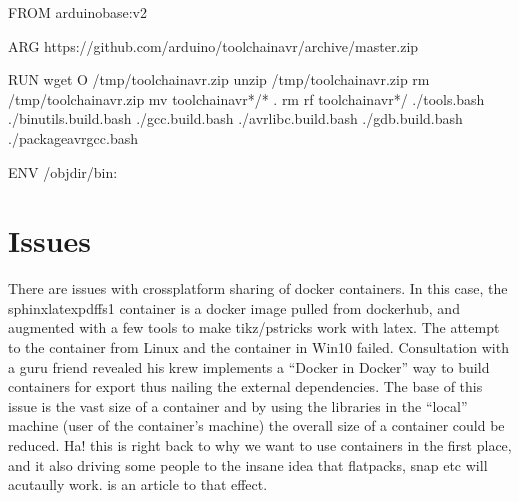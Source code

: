 \documentclass[letterpaper,10pt,english,openany,oneside]{sphinxmanual}
\begin{document}
\begin{sphinxVerbatim}[commandchars=\\\{\},numbers=left,firstnumber=1,stepnumber=1]
FROM arduino\PYGZus{}base:v2

ARG https://github.com/arduino/toolchain\PYGZhy{}avr/archive/master.zip

RUN wget  \PYGZhy{}O /tmp/toolchain\PYGZhy{}avr.zip  
    unzip /tmp/toolchain\PYGZhy{}avr.zip  
    rm /tmp/toolchain\PYGZhy{}avr.zip  
    mv toolchain\PYGZhy{}avr*/* .  
    rm \PYGZhy{}rf toolchain\PYGZhy{}avr*/  
    ./tools.bash  
    ./binutils.build.bash  
    ./gcc.build.bash  
    ./avr\PYGZhy{}libc.build.bash  
    ./gdb.build.bash  
    ./package\PYGZhy{}avr\PYGZhy{}gcc.bash

ENV /objdir/bin:
\end{sphinxVerbatim}


\section{Issues}
\label{\detokenize{docker:issues}}
\sphinxAtStartPar
There are issues with cross\sphinxhyphen{}platform sharing of docker containers.
In this case, the sphinx\sphinxhyphen{}latexpdf\sphinxhyphen{}fs1 container is a docker image
pulled from dockerhub, and augmented with a few tools to make
tikz/pstricks work with latex. The attempt to  the container
from Linux and  the container in Win10 failed. Consultation
with a guru friend revealed his krew implements a “Docker in Docker”
way to build containers for export \textendash{} thus nailing the external dependencies.
The base of this issue is the vast size of a container and by using
the libraries in the “local” machine (user of the container’s machine)
the overall size of a container could be reduced. Ha! this is right
back to why we want to use containers in the first place, and it
also driving some people to the insane idea that flatpacks, snap etc
will acutaully work.  is an article to that effect.
\end{document}
